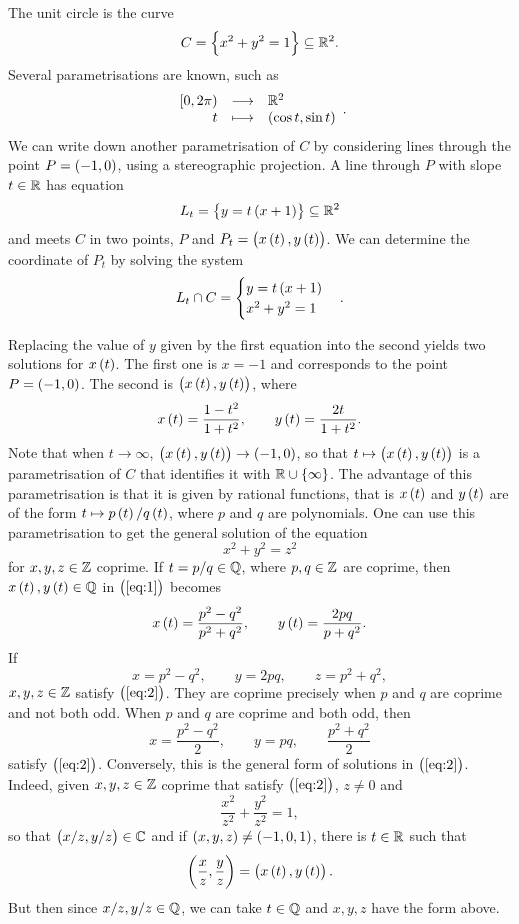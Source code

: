 \begin{example}
The unit circle is the curve
$$ C = \cbr{x^2 + y^2 = 1} \subseteq \RR^2. $$
Several parametrisations are known, such as
$$ \function{\intco{0, 2\pi}}{\RR^2}{t}{\br{\cos t, \sin t}}. $$
We can write down another parametrisation of $ C $ by considering lines through the point $ P = \br{-1, 0} $, using a stereographic projection. A line through $ P $ with slope $ t \in \mathbb{R} $ has equation
$$ L_t = \cbr{y = t\br{x + 1}} \subseteq \RR^2 $$
and meets $ C $ in two points, $ P $ and $ P_t = \br{x\br{t}, y\br{t}} $. We can determine the coordinate of $ P_t $ by solving the system
$$ L_t \cap C =
\begin{cases}
y = t\br{x + 1} \\
x^2 + y^2 = 1
\end{cases}.
$$

\pagebreak

Replacing the value of $ y $ given by the first equation into the second yields two solutions for $ x\br{t} $. The first one is $ x = -1 $ and corresponds to the point $ P = \br{-1, 0} $. The second is $ \br{x\br{t}, y\br{t}} $, where
\begin{equation}
\label{eq:1}
x\br{t} = \dfrac{1 - t^2}{1 + t^2}, \qquad y\br{t} = \dfrac{2t}{1 + t^2}.
\end{equation}
Note that when $ t \to \infty $, $ \br{x\br{t}, y\br{t}} \to \br{-1, 0} $, so that $ t \mapsto \br{x\br{t}, y\br{t}} $ is a parametrisation of $ C $ that identifies it with $ \RR \cup \cbr{\infty} $. The advantage of this parametrisation is that it is given by rational functions, that is $ x\br{t} $ and $ y\br{t} $ are of the form $ t \mapsto p\br{t} / q\br{t} $, where $ p $ and $ q $ are polynomials. One can use this parametrisation to get the general solution of the equation
\begin{equation}
\label{eq:2}
x^2 + y^2 = z^2
\end{equation}
for $ x, y, z \in \mathbb{Z} $ coprime. If $ t = p / q \in \mathbb{Q} $, where $ p, q \in \mathbb{Z} $ are coprime, then $ x\br{t}, y\br{t} \in \QQ $ in $ \br{\ref{eq:1}} $ becomes
$$ x\br{t} = \dfrac{p^2 - q^2}{p^2 + q^2}, \qquad y\br{t} = \dfrac{2pq}{p + q^2}. $$
If
$$ x = p^2 - q^2, \qquad y = 2pq, \qquad z = p^2 + q^2, $$
$ x, y, z \in \mathbb{Z} $ satisfy $ \br{\ref{eq:2}} $. They are coprime precisely when $ p $ and $ q $ are coprime and not both odd. When $ p $ and $ q $ are coprime and both odd, then
$$ x = \dfrac{p^2 - q^2}{2}, \qquad y = pq, \qquad \dfrac{p^2 + q^2}{2} $$
satisfy $ \br{\ref{eq:2}} $. Conversely, this is the general form of solutions in $ \br{\ref{eq:2}} $. Indeed, given $ x, y, z \in \mathbb{Z} $ coprime that satisfy $ \br{\ref{eq:2}} $, $ z \ne 0 $ and
$$ \dfrac{x^2}{z^2} + \dfrac{y^2}{z^2} = 1, $$
so that $ \br{x / z, y / z} \in \CC $ and if $ \br{x, y, z} \ne \br{-1, 0, 1} $, there is $ t \in \mathbb{R} $ such that
$$ \br{\dfrac{x}{z}, \dfrac{y}{z}} = \br{x\br{t}, y\br{t}}. $$
But then since $ x / z, y / z \in \mathbb{Q} $, we can take $ t \in \mathbb{Q} $ and $ x, y, z $ have the form above.
\end{example}


